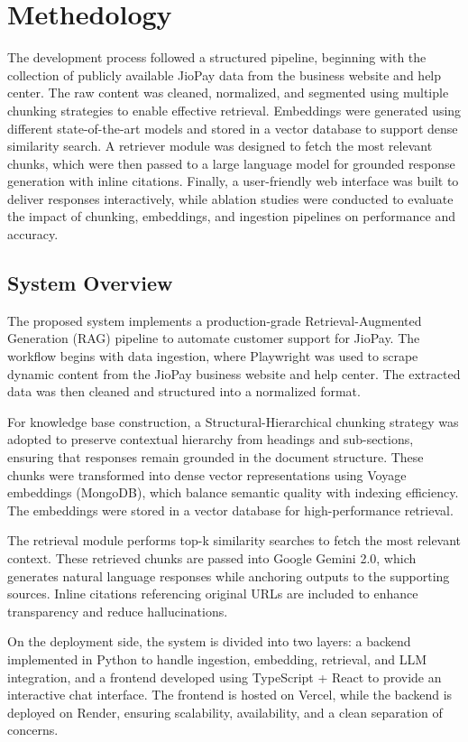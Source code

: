 \section{Methedology}
The development process followed a structured pipeline, beginning with the collection of publicly available JioPay data from the business website and help center. The raw content was cleaned, normalized, and segmented using multiple chunking strategies to enable effective retrieval. Embeddings were generated using different state-of-the-art models and stored in a vector database to support dense similarity search. A retriever module was designed to fetch the most relevant chunks, which were then passed to a large language model for grounded response generation with inline citations. Finally, a user-friendly web interface was built to deliver responses interactively, while ablation studies were conducted to evaluate the impact of chunking, embeddings, and ingestion pipelines on performance and accuracy.

\subsection{System Overview}\label{AA}
The proposed system implements a production-grade Retrieval-Augmented Generation (RAG) pipeline to automate customer support for JioPay. The workflow begins with data ingestion, where Playwright was used to scrape dynamic content from the JioPay business website and help center. The extracted data was then cleaned and structured into a normalized format.

For knowledge base construction, a Structural-Hierarchical chunking strategy was adopted to preserve contextual hierarchy from headings and sub-sections, ensuring that responses remain grounded in the document structure. These chunks were transformed into dense vector representations using Voyage embeddings (MongoDB), which balance semantic quality with indexing efficiency. The embeddings were stored in a vector database for high-performance retrieval.

The retrieval module performs top-k similarity searches to fetch the most relevant context. These retrieved chunks are passed into Google Gemini 2.0, which generates natural language responses while anchoring outputs to the supporting sources. Inline citations referencing original URLs are included to enhance transparency and reduce hallucinations.

On the deployment side, the system is divided into two layers: a backend implemented in Python to handle ingestion, embedding, retrieval, and LLM integration, and a frontend developed using TypeScript + React to provide an interactive chat interface. The frontend is hosted on Vercel, while the backend is deployed on Render, ensuring scalability, availability, and a clean separation of concerns.

